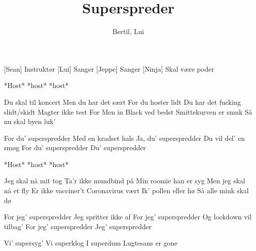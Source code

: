 \documentclass[a4paper,11pt]{article}
\title{Superspreder}
\author{Bertil, Lui}
\begin{document}
\maketitle

\begin{roles}
[Sean] Instruktør
[Lui] Sanger
[Jeppe] Sanger
 [Ninja] Skal være poder
\end{roles}

\begin{props}
\prop{}
\prob{}
\prob{}
\prob{}
\prob{}
\end{props}

\begin{song}
 *Host* *host* *host*

Du skal til koncert
Men du har det sært
For du hoster lidt
Du har det fucking slidt/skidt
Magter ikke test
For Men in Black ved bedst
Smittekurven er smuk
Så nu skal byen luk’

For du’ superspredder
Med en kradset hals
Ja, du’ superspredder
Du vil del’ en smøg
For du’ superspredder
Du’ superspredder

*Host* *host* *host*

Jeg skal nå mit tog
Ta’r ikke mundbind på
Min roomie han er syg
Men jeg skal nå et fly
Er ikke vacciner’t
Coronavirus vært
Ik’ pollen eller hø
Så alle mink skal dø

For jeg’ superspredder
Jeg spritter ikke af
For jeg’ superspredder
Og lockdown vil tilbag’
For jeg’ superspredder
Jeg’ superspredder
 
Vi’ supersyg’
Vi superklog
I superdum
Lugtesans er gone

\end{song}
\end{document}
